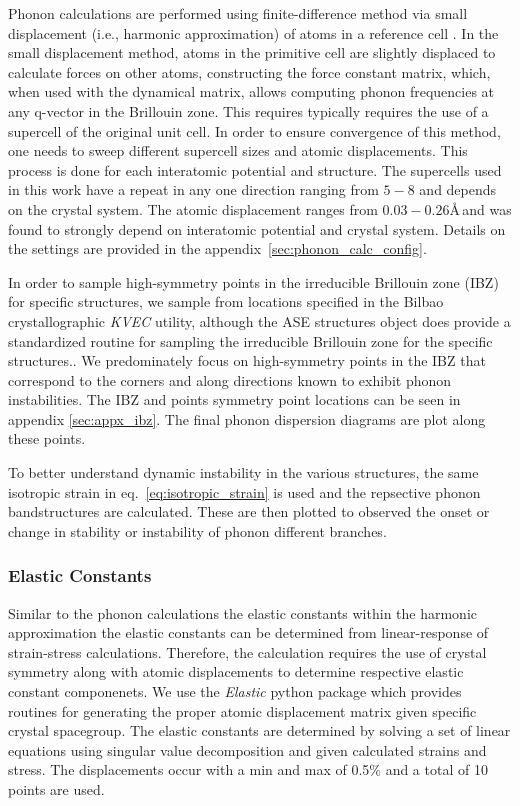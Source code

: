 \documentclass[preprint,colorlinks=true,linkcolor=black,citecolor=black]{elsarticle}
\begin{document}
Phonon calculations are performed using finite-difference method via
small displacement (i.e., harmonic approximation) of atoms in a
reference cell \cite{Alfe2009}. In the small displacement method,
atoms in the primitive cell are slightly displaced to calculate forces
on other atoms, constructing the force constant matrix, which, when
used with the dynamical matrix, allows computing phonon frequencies at
any q-vector in the Brillouin zone. This requires typically requires
the use of a supercell of the original unit cell. In order to ensure
convergence of this method, one needs to sweep different supercell
sizes and atomic displacements. This process is done for each
interatomic potential and structure. The supercells used in this work
have a repeat in any one direction ranging from $5-8$ and depends on
the crystal system. The atomic displacement ranges from
$0.03-0.26$\AA\,and was found to strongly depend on interatomic
potential and crystal system. Details on the settings are provided in
the appendix~\ref{sec:phonon_calc_config}. \par

In order to sample high-symmetry points in the irreducible Brillouin
zone (IBZ) for specific structures, we sample from locations specified
in the Bilbao crystallographic \textit{KVEC} utility\cite{Aroyo2014},
although the ASE structures object does provide a standardized routine
for sampling the irreducible Brillouin zone for the specific
structures.\cite{Setyawan2010}. We predominately focus on
high-symmetry points in the IBZ that correspond to the corners and
along directions known to exhibit phonon instabilities. The IBZ and
points symmetry point locations can be seen in appendix
\ref{sec:appx_ibz}. The final phonon dispersion diagrams are plot
along these points. \par

To better understand dynamic instability in the various structures,
the same isotropic strain in eq.~\ref{eq:isotropic_strain} is used and
the repsective phonon bandstructures are calculated. These are then
plotted to observed the onset or change in stability or instability of
phonon different branches. \par

\subsubsection{Elastic Constants}

Similar to the phonon calculations the elastic constants within the
harmonic approximation the elastic constants can be determined from
linear-response of strain-stress calculations. Therefore, the
calculation requires the use of crystal symmetry along with atomic
displacements to determine respective elastic constant componenets. We
use the \textit{Elastic}\cite{Jochym2018} python package which
provides routines for generating the proper atomic displacement matrix
given specific crystal spacegroup. The elastic constants are
determined by solving a set of linear equations using singular value
decomposition and given calculated strains and stress. The
displacements occur with a min and max of 0.5\% and a total of 10
points are used. \par
\end{document}
